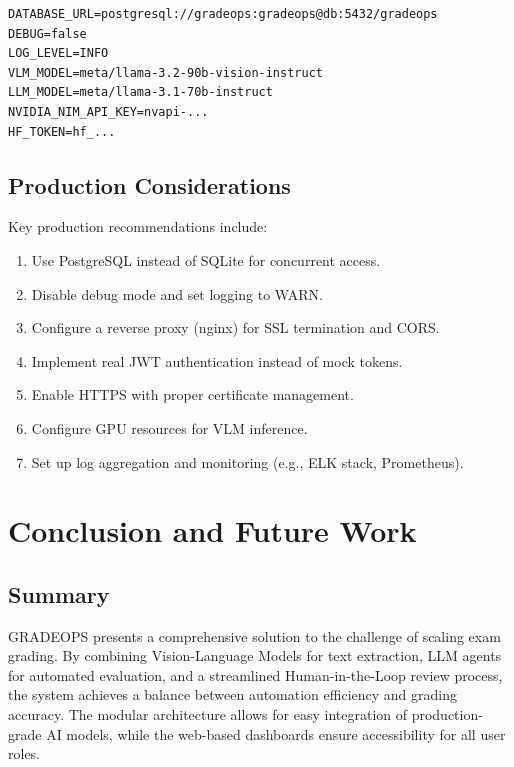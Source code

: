 \documentclass[11pt,a4paper]{article}
\begin{document}
\begin{lstlisting}[caption={Environment variables}]
DATABASE_URL=postgresql://gradeops:gradeops@db:5432/gradeops
DEBUG=false
LOG_LEVEL=INFO
VLM_MODEL=meta/llama-3.2-90b-vision-instruct
LLM_MODEL=meta/llama-3.1-70b-instruct
NVIDIA_NIM_API_KEY=nvapi-...
HF_TOKEN=hf_...
\end{lstlisting}

\subsection{Production Considerations}

Key production recommendations include:

\begin{enumerate}[leftmargin=2em]
    \item Use PostgreSQL instead of SQLite for concurrent access.
    \item Disable debug mode and set logging to WARN.
    \item Configure a reverse proxy (nginx) for SSL termination and CORS.
    \item Implement real JWT authentication instead of mock tokens.
    \item Enable HTTPS with proper certificate management.
    \item Configure GPU resources for VLM inference.
    \item Set up log aggregation and monitoring (e.g., ELK stack, Prometheus).
\end{enumerate}

\newpage
\section{Conclusion and Future Work}
\label{sec:conclusion}

\subsection{Summary}
GRADEOPS presents a comprehensive solution to the challenge of scaling exam grading. By combining Vision-Language Models for text extraction, LLM agents for automated evaluation, and a streamlined Human-in-the-Loop review process, the system achieves a balance between automation efficiency and grading accuracy. The modular architecture allows for easy integration of production-grade AI models, while the web-based dashboards ensure accessibility for all user roles.
\end{document}
